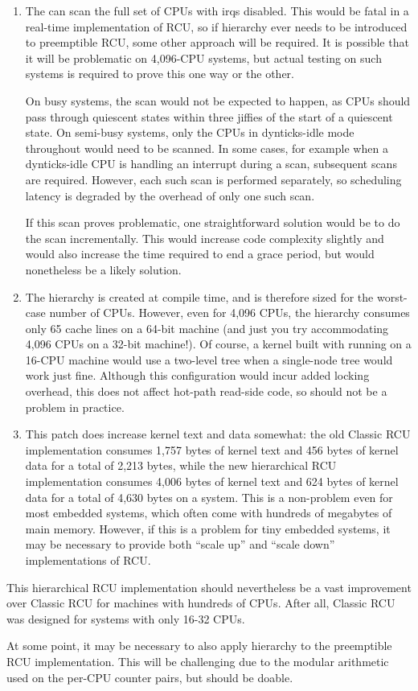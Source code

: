 \begin{enumerate}
\item	The  can scan the full
	set of CPUs with irqs disabled.
	This would be fatal in a real-time implementation of RCU,
	so if hierarchy ever needs to be introduced to preemptible
	RCU, some other approach will be required.
	It is possible that it will be problematic on 4,096-CPU
	systems, but actual testing on such systems is required
	to prove this one way or the other.
	
	On busy systems, the  scan
	would not be expected to happen,
	as CPUs should pass through quiescent states within three
	jiffies of the start of a quiescent state.  On semi-busy
	systems, only the CPUs in dynticks-idle mode throughout would
	need to be scanned.
	In some cases, for example when a dynticks-idle CPU is handling
	an interrupt during a scan, subsequent scans are required.
	However, each such scan is performed separately, so scheduling
	latency is degraded by the overhead of only one such scan.
	
	If this scan proves problematic, one straightforward solution
	would be to do the scan incrementally.
	This would increase code complexity slightly and would also
	increase the time required to end a grace period, but would
	nonetheless be a likely solution.
	
\item	The  hierarchy is created at compile
	time, and is therefore sized for the worst-case 
	number of CPUs.
	However, even for 4,096 CPUs, the 
	hierarchy consumes only 65 cache lines on a 64-bit machine
	(and just you try accommodating 4,096 CPUs on a 32-bit machine!).
	Of course, a kernel built with 
	running on a 16-CPU machine would use a two-level tree when
	a single-node tree would work just fine.
	Although this configuration would incur added locking overhead,
	this does not affect hot-path read-side code, so should not be a
	problem in practice.
	
\item	This patch does increase kernel text and data somewhat:
	the old Classic RCU implementation consumes 1,757 bytes of
	kernel text and 456 bytes of kernel data for a total of 2,213 bytes,
	while the new hierarchical RCU implementation consumes 4,006
	bytes of kernel text and 624 bytes of kernel data for a total
	of 4,630 bytes on a  system.
	This is a non-problem even for most embedded systems, which
	often come with hundreds of megabytes of main memory.
	However, if this is a problem for tiny embedded systems, it may
	be necessary to provide both ``scale up'' and
	``scale down'' implementations of RCU.
\end{enumerate}

This hierarchical RCU implementation should nevertheless be a vast
improvement over Classic RCU for machines with hundreds of CPUs.
After all, Classic RCU was designed for systems with only 16-32 CPUs.

At some point, it may be necessary to also apply hierarchy to the
preemptible RCU implementation.
This will be challenging due to the modular arithmetic used on the
per-CPU counter pairs, but should be doable.
